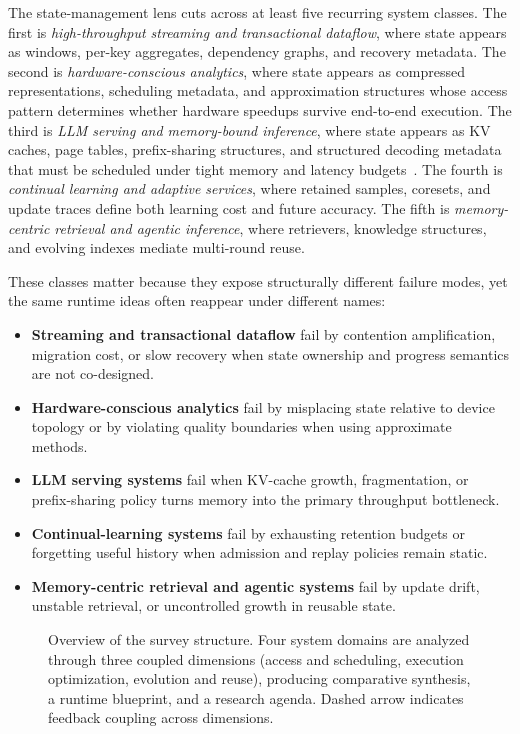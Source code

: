 \documentclass[acmsmall,screen,review]{acmart}
\begin{document}
The state-management lens cuts across at least five recurring system classes. The first is \emph{high-throughput streaming and transactional dataflow}, where state appears as windows, per-key aggregates, dependency graphs, and recovery metadata. The second is \emph{hardware-conscious analytics}, where state appears as compressed representations, scheduling metadata, and approximation structures whose access pattern determines whether hardware speedups survive end-to-end execution. The third is \emph{LLM serving and memory-bound inference}, where state appears as KV caches, page tables, prefix-sharing structures, and structured decoding metadata that must be scheduled under tight memory and latency budgets~\cite{kwon2023pagedattention,agrawal2024sarathi,zheng2023sglang}. The fourth is \emph{continual learning and adaptive services}, where retained samples, coresets, and update traces define both learning cost and future accuracy. The fifth is \emph{memory-centric retrieval and agentic inference}, where retrievers, knowledge structures, and evolving indexes mediate multi-round reuse.

These classes matter because they expose structurally different failure modes, yet the same runtime ideas often reappear under different names:
\begin{itemize}[leftmargin=*]
\item \textbf{Streaming and transactional dataflow} fail by contention amplification, migration cost, or slow recovery when state ownership and progress semantics are not co-designed.
\item \textbf{Hardware-conscious analytics} fail by misplacing state relative to device topology or by violating quality boundaries when using approximate methods.
\item \textbf{LLM serving systems} fail when KV-cache growth, fragmentation, or prefix-sharing policy turns memory into the primary throughput bottleneck.
\item \textbf{Continual-learning systems} fail by exhausting retention budgets or forgetting useful history when admission and replay policies remain static.
\item \textbf{Memory-centric retrieval and agentic systems} fail by update drift, unstable retrieval, or uncontrolled growth in reusable state.
\end{itemize}

\begin{figure}[t]
\centering
\resizebox{0.98\textwidth}{!}{}
\caption{Overview of the survey structure. Four system domains are analyzed through three coupled dimensions (access and scheduling, execution optimization, evolution and reuse), producing comparative synthesis, a runtime blueprint, and a research agenda. Dashed arrow indicates feedback coupling across dimensions.}
\label{fig:poster-overview}
\end{figure}
\end{document}
